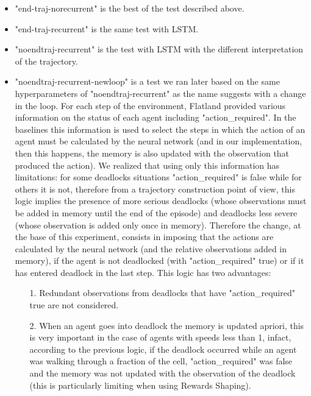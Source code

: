 \documentclass[11pt, a4paper, hidelinks]{report}
\begin{document}
\begin{itemize}
	\item "end-traj-norecurrent" is the best of the test described above.
	\item "end-traj-recurrent" is the same test with LSTM\@.
	\item "noendtraj-recurrent" is the test with LSTM with the different interpretation of the trajectory.
	\item "noendtraj-recurrent-newloop" is a test we ran later based on the same hyperparameters of "noendtraj-recurrent" as the name suggests with a change in the loop.
	For each step of the environment, Flatland provided various information on the status of each agent including "action\_required".
	In the baselines this information is used to select the steps in which the action of an agent must be calculated by the neural network (and in our implementation, then this happens, the memory is also updated with the observation that produced the action).
	We realized that using only this information has limitations: for some deadlocks situations "action\_required" is false while for others it is not, therefore from a trajectory construction point of view, this logic implies the presence of more serious deadlocks (whose observations must be added in memory until the end of the episode) and deadlocks less severe (whose observation is added only once in memory).
	Therefore the change, at the base of this experiment, consists in imposing that the actions are calculated by the neural network (and the relative observations added in memory), if the agent is not deadlocked (with "action\_required" true) or if it has entered deadlock in the last step.
	This logic has two advantages:
	\begin{enumerate}
		\item [1.] Redundant observations from deadlocks that have "action\_required" true are not considered.
		\item [2.] When an agent goes into deadlock the memory is updated apriori, this is very important in the case of agents with speeds less than 1, infact, according to the previous logic, if the deadlock occurred while an agent was walking through a fraction of the cell, "action\_required" was false and the memory was not updated with the observation of the deadlock (this is particularly limiting when using Rewards Shaping).
	\end{enumerate}
\end{itemize}
\end{document}
